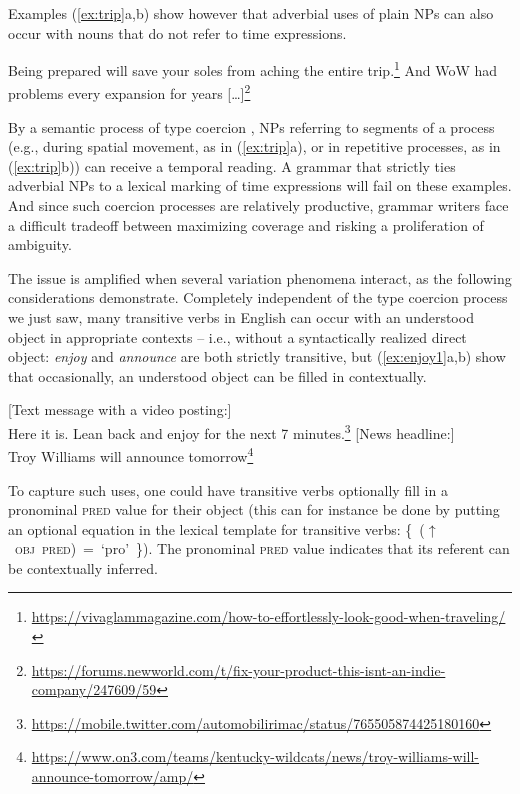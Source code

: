\documentclass[output=paper,hidelinks]{langscibook}
\begin{document}
\noindent
Examples (\ref{ex:trip}a,b) show however that adverbial uses of plain NPs can also occur with nouns that do not refer to time expressions. 

\ea\label{ex:trip}
\ea Being prepared will save your soles from aching the entire trip.\footnote{\url{https://vivaglammagazine.com/how-to-effortlessly-look-good-when-traveling/}}
\ex And WoW had problems every expansion for years [\dots]\footnote{\url{https://forums.newworld.com/t/fix-your-product-this-isnt-an-indie-company/247609/59}}
\z
\z

\noindent
By a semantic process of type coercion \citep[see, e.g.,][]{pustejovsky1995generative}, NPs referring to segments of a process (e.g., during spatial movement, as in (\ref{ex:trip}a), or in repetitive processes, as in (\ref{ex:trip}b)) can receive a temporal reading.  A grammar that strictly ties adverbial NPs to a lexical marking of time expressions will fail on these examples.
And since such coercion processes are relatively productive, grammar writers face a difficult tradeoff between maximizing coverage and risking a proliferation of ambiguity. 

The issue is amplified when several variation phenomena interact, as the following considerations demonstrate. Completely independent of the type coercion process we just saw, many transitive verbs in English can occur with an understood object in appropriate contexts -- i.e., without a syntactically realized direct object: \emph{enjoy} and \emph{announce} are both strictly transitive, but (\ref{ex:enjoy1}a,b) show that occasionally, an understood object can be filled in contextually.  


\ea\label{ex:enjoy1}
\ea {}[Text message with a video posting:] \\Here it is. Lean back and enjoy for the next 7 minutes.\footnote{\url{https://mobile.twitter.com/automobilirimac/status/765505874425180160}}
\ex {}[News headline:] \\Troy Williams will announce tomorrow\footnote{\url{https://www.on3.com/teams/kentucky-wildcats/news/troy-williams-will-announce-tomorrow/amp/}}
\z
\z

\noindent
To capture such uses, one could have transitive verbs optionally fill in a pronominal \textsc{pred} value for their object (this can for instance be done by putting an optional equation in the lexical template for transitive verbs:
 \hbox{\{ ($\uparrow$ \textsc{obj pred}) =  `pro' \}}). The pronominal \textsc{pred} value indicates that its referent can be contextually inferred.
\end{document}
